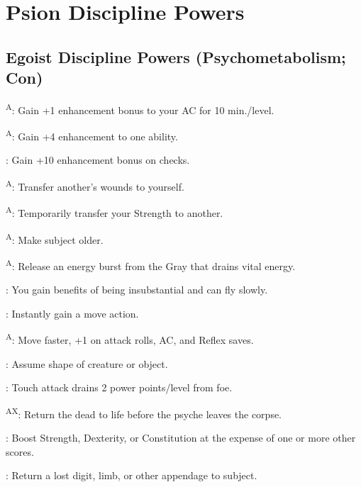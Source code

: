 \section{Psion Discipline Powers}



\subsection{Egoist Discipline Powers {\normalsize(Psychometabolism; Con)}}
\begin{enumerate*}
\item {}\textsuperscript{A}: Gain +1 enhancement bonus to your AC for 10 min./level.
\item {}\textsuperscript{A}: Gain +4 enhancement to one ability.

: Gain +10 enhancement bonus on  checks.

\textsuperscript{A}: Transfer another's wounds to yourself.

\textsuperscript{A}: Temporarily transfer your Strength to another. %

\item {}\textsuperscript{A}: Make subject older. %

\textsuperscript{A}: Release an energy burst from the Gray that drains vital energy. %

: You gain benefits of being insubstantial and can fly slowly.

: Instantly gain a move action.

\item {}\textsuperscript{A}: Move faster, +1 on attack rolls, AC, and Reflex saves. %

: Assume shape of creature or object.

: Touch attack drains 2 power points/level from foe.

\item {}\textsuperscript{AX}: Return the dead to life before the psyche leaves the corpse.

: Boost Strength, Dexterity, or Constitution at the expense of one or more other scores.

: Return a lost digit, limb, or other appendage to subject.


\end{enumerate*}
